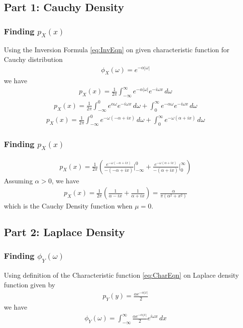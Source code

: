 \documentclass{beamer}
\begin{document}
\subsection{Part 1: Cauchy Density}
\begin{frame}
	\frametitle{Finding $p_X(x)$}
	Using the Inversion Formula
	\eqref{eq:InvEqn}
	on given characteristic function for Cauchy distribution
	\begin{align}
		\phi_X(\omega) = e^{-\alpha|\omega|}
		\label{eq:CauchyChar}
	\end{align}
	we have
	\begin{align}
		p_X(x) = \frac{1}{2\pi} \int_{-\infty}^{\infty} e^{-\alpha|\omega|} e^{-i\omega x} \,d\omega
	\end{align}
	\begin{align}
		p_X(x) = \frac{1}{2\pi} \int_{-\infty}^{0} e^{\alpha\omega} e^{-i\omega x} \,d\omega + \int_{0}^{\infty} e^{-\alpha\omega} e^{-i\omega x} \,d\omega
	\end{align}
	\begin{align}
		p_X(x) = \frac{1}{2\pi} \int_{-\infty}^{0} e^{-\omega(-\alpha + ix)} \,d\omega + \int_{0}^{\infty} e^{-\omega(\alpha + ix)} \,d\omega
	\end{align}

\end{frame}

\begin{frame}
	\frametitle{Finding $p_X(x)$}
	\begin{align}
		p_X(x) = \frac{1}{2\pi} (\frac{e^{-\omega(-\alpha + ix)}}{-(-\alpha + ix)} \big|^{0}_{-\infty} + \frac{e^{-\omega(\alpha + ix)}}{-(\alpha + ix)} \big|^{\infty}_{0})
	\end{align}
	Assuming $\alpha > 0$, we have
	\begin{align}
		p_X(x) = \frac{1}{2\pi} (\frac{1}{\alpha - ix} + \frac{1}{\alpha + ix}) = \frac{\alpha}{\pi(\alpha^2 + x^2)}
		\label{eq:CauchyDis}
	\end{align}
	which is the Cauchy Density function when $\mu = 0$.
\end{frame}

\subsection{Part 2: Laplace Density}
\begin{frame}
	\frametitle{Finding $\phi_Y(\omega)$}
	Using definition of the Characteristic function
	\eqref{eq:CharEqn}
	on Laplace density function given by
	\begin{align}
		p_Y(y) = \frac{\alpha e^{-\alpha|x|}}{2}
		\label{eq:LapDis}
	\end{align}
	we have
	\begin{align}
		\phi_Y(\omega) = \int_{-\infty}^{\infty} \frac{\alpha e^{-\alpha|x|}}{2} e^{i\omega x} \,dx
	\end{align}

\end{frame}
\end{document}
